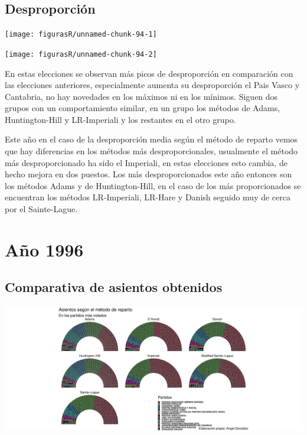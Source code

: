 \documentclass[12pt,a4paper,]{book}
\numberwithin{dummy}{section}
\theoremstyle{ocrenumbox}
\theoremstyle{blacknumex}
\theoremstyle{blacknumbox}
\theoremstyle{ocrenum}
\theoremstyle{ocrenum}
\begin{document}
\hypertarget{desproporciuxf3n-5}{%
\subsection{Desproporción}\label{desproporciuxf3n-5}}

\begin{center}\texttt{[image: figurasR/unnamed-chunk-94-1]} \end{center}

\begin{center}\texttt{[image: figurasR/unnamed-chunk-94-2]} \end{center}

En estas elecciones se observan más picos de desproporción en
comparación con las elecciones anteriores, especialmente aumenta su
desproporción el Pais Vasco y Cantabria, no hay novedades en los máximos
ni en los mínimos. Siguen dos grupos con un comportamiento similar, en
un grupo los métodos de Adams, Huntington-Hill y LR-Imperiali y los
restantes en el otro grupo.

Este año en el caso de la desproporción media según el método de reparto
vemos que hay diferencias en los métodos más desproporcionales,
usualmente el método más desproporcionado ha sido el Imperiali, en estas
elecciones esto cambia, de hecho mejora en dos puestos. Los más
desproporcionados este año entonces son los métodos Adams y de
Huntington-Hill, en el caso de los más proporcionados se encuentran los
métodos LR-Imperiali, LR-Hare y Danish seguido muy de cerca por el
Sainte-Lague.

\hypertarget{auxf1o-1996}{%
\section{Año 1996}\label{auxf1o-1996}}

\hypertarget{comparativa-de-asientos-obtenidos-6}{%
\subsection{Comparativa de asientos
obtenidos}\label{comparativa-de-asientos-obtenidos-6}}

\begin{center}\includegraphics[width=1\linewidth]{figurasR/unnamed-chunk-96-1} \end{center}
\end{document}
